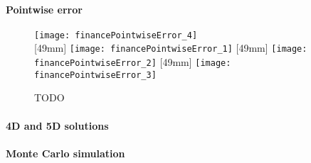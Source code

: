 \dummytext[2]{}

\paragraph{Pointwise error}

\begin{figure}
  \texttt{[image: financePointwiseError\_4]}%
  \\[2mm]%
  [49mm]{%
    \texttt{[image: financePointwiseError\_1]}%
  }%
  \hfill%
  [49mm]{%
    \texttt{[image: financePointwiseError\_2]}%
  }%
  \hfill%
  [49mm]{%
    \texttt{[image: financePointwiseError\_3]}%
  }%
  \caption[TODO]{%
    TODO%
  }%
  \label{fig:financePointwiseError}%
\end{figure}

\dummytext[3]{}

\paragraph{4D and 5D solutions}

\dummytext[2]{}

\paragraph{Monte Carlo simulation}



